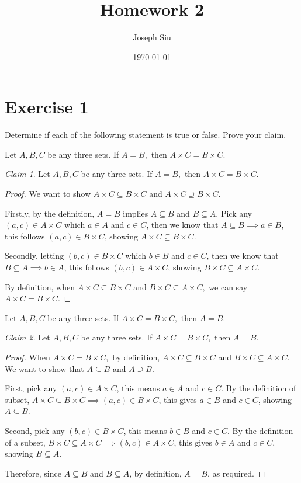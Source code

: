 \documentclass{homework}
\author{Joseph Siu}
\date{\today}
\title{Homework 2}
\theoremstyle{remark}
\newtheorem*{claim}{Claim}
\newcommand{\?}{\stackrel{?}{=}}
\begin{document}
 \maketitle

\section*{Exercise 1}
Determine if each of the following statement is true or false. Prove your claim. 

\question Let $A,B,C$ be any three sets. If $A=B,$ then $A\times C=B\times C.$ 
\begin{claim}
    Let $A,B,C$ be any three sets. If $A=B,$ then $A\times C=B\times C.$ 
\end{claim}
\begin{proof}
    We want to show $A\times C\subseteq B\times C$ and $A\times C \supseteq B\times C$.
    
    Firstly, by the definition, $A=B$ implies $A\subseteq B$ and $B\subseteq A$. Pick any $(a,c)\in A\times C$ which $a\in A$ and $c\in C$, then we know that $A\subseteq B\implies a\in B$, this follows $(a,c)\in B\times C$, showing $A\times C\subseteq B\times C$. 

    Secondly, letting $(b,c)\in B\times C$ which $b\in B$ and $c\in C$, then we know that $B\subseteq A\implies b\in A$, this follows $(b,c)\in A\times C$, showing $B\times C\subseteq A\times C$. 
    
    By definition, when $A\times C\subseteq B\times C$ and $B\times C\subseteq A\times C,$ we can say $A\times C = B \times C$. 
\end{proof}

\question Let $A,B,C$ be any three sets. If $A\times C=B\times C,$ then $A=B$.
\begin{claim}
    Let $A,B,C$ be any three sets. If $A\times C=B\times C,$ then $A=B$.
\end{claim}
\begin{proof}
    When $A\times C = B \times C,$ by definition, $A\times C\subseteq B\times C$ and $B\times C\subseteq A\times C$. We want to show that $A\subseteq B$ and $A\supseteq B$. 

    First, pick any $(a,c)\in A\times C$, this means $a\in A$ and $c\in C$. By the definition of subset, $A\times C\subseteq B\times C \implies (a,c)\in B\times C$, this gives $a\in B$ and $c\in C$, showing $A\subseteq B$. 

    Second, pick any $(b,c)\in B\times C$, this means $b\in B$ and $c\in C$. By the definition of a subset, $B\times C\subseteq A\times C \implies (b,c)\in A\times C$, this gives $b\in A$ and $c\in C$, showing $B\subseteq A$. 

    Therefore, since $A\subseteq B$ and $B\subseteq A$, by definition, $A=B$, as required.
\end{proof}
\end{document}
